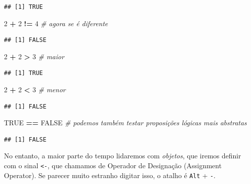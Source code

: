 \documentclass[
]{article}
\newenvironment{Shaded}{\begin{snugshade}}{\end{snugshade}}
\newcommand{\CommentTok}[1]{\textcolor[rgb]{0.56,0.35,0.01}{\textit{#1}}}
\newcommand{\DecValTok}[1]{\textcolor[rgb]{0.00,0.00,0.81}{#1}}
\newcommand{\OperatorTok}[1]{\textcolor[rgb]{0.81,0.36,0.00}{\textbf{#1}}}
\newcommand{\OtherTok}[1]{\textcolor[rgb]{0.56,0.35,0.01}{#1}}
\newcommand{\StringTok}[1]{\textcolor[rgb]{0.31,0.60,0.02}{#1}}
\begin{document}
\begin{verbatim}
## [1] TRUE
\end{verbatim}

\begin{Shaded}
\begin{Highlighting}[]
\DecValTok{2} \OperatorTok{+}\StringTok{ }\DecValTok{2} \OperatorTok{!=}\StringTok{ }\DecValTok{4} \CommentTok{# agora se é diferente}
\end{Highlighting}
\end{Shaded}

\begin{verbatim}
## [1] FALSE
\end{verbatim}

\begin{Shaded}
\begin{Highlighting}[]
\DecValTok{2} \OperatorTok{+}\StringTok{ }\DecValTok{2} \OperatorTok{>}\StringTok{ }\DecValTok{3} \CommentTok{# maior}
\end{Highlighting}
\end{Shaded}

\begin{verbatim}
## [1] TRUE
\end{verbatim}

\begin{Shaded}
\begin{Highlighting}[]
\DecValTok{2} \OperatorTok{+}\StringTok{ }\DecValTok{2} \OperatorTok{<}\StringTok{ }\DecValTok{3} \CommentTok{# menor}
\end{Highlighting}
\end{Shaded}

\begin{verbatim}
## [1] FALSE
\end{verbatim}

\begin{Shaded}
\begin{Highlighting}[]
\OtherTok{TRUE} \OperatorTok{==}\StringTok{ }\OtherTok{FALSE} \CommentTok{# podemos também testar proposições lógicas mais abstratas}
\end{Highlighting}
\end{Shaded}

\begin{verbatim}
## [1] FALSE
\end{verbatim}

No entanto, a maior parte do tempo lidaremos com \emph{objetos}, que
iremos definir com o sinal \texttt{\textless{}-}, que chamamos de
Operador de Designação (Assignment Operator). Se parecer muito estranho
digitar isso, o atalho é \texttt{Alt} + \texttt{-}.
\end{document}
